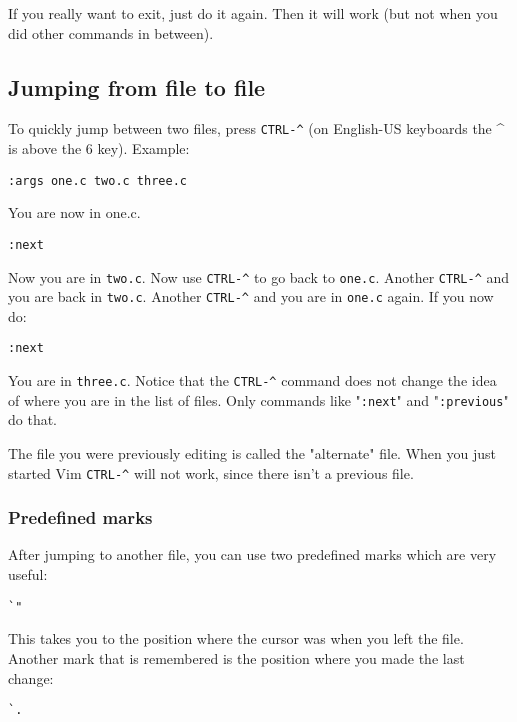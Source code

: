 If you really want to exit, just do it again.
Then it will work (but not when you did other commands in between).

\subsection{Jumping from file to file}
To quickly jump between two files, press \texttt{CTRL-\^{}}  (on English-US keyboards the \^{}  is above the 6 key).
Example:

 \begin{Verbatim}[samepage=true]
 :args one.c two.c three.c
 \end{Verbatim}

You are now in one.c.

 \begin{Verbatim}[samepage=true]
 :next
 \end{Verbatim}

Now you are in \texttt{two.c}.
Now use \texttt{CTRL-\^{}} to go back to \texttt{one.c}.
Another \texttt{CTRL-\^{}} and you are back in \texttt{two.c}.
Another \texttt{CTRL-\^{}} and you are in \texttt{one.c} again.
If you now do:

 \begin{Verbatim}[samepage=true]
 :next
 \end{Verbatim}

You are in \texttt{three.c}.
Notice that the \texttt{CTRL-\^{}} command does not change the idea of where you are in the list of files.
Only commands like "\texttt{:next}" and "\texttt{:previous}" do that.

The file you were previously editing is called the "alternate" file.
When you just started Vim \texttt{CTRL-\^{}} will not work, since there isn't a previous file.

\subsubsection{Predefined marks}
After jumping to another file, you can use two predefined marks which are very useful:

 \begin{Verbatim}[samepage=true]
 `"
 \end{Verbatim}

This takes you to the position where the cursor was when you left the file.
Another mark that is remembered is the position where you made the last change:

 \begin{Verbatim}[samepage=true]
 `.
 \end{Verbatim}


